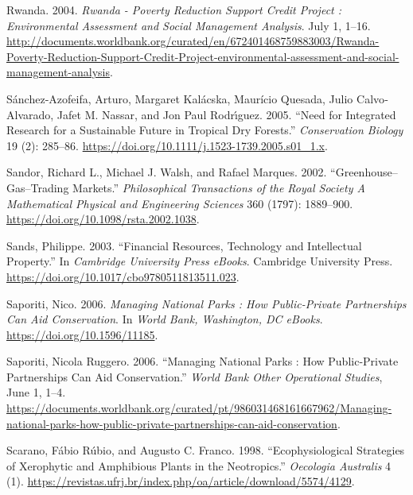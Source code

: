 \begin{CSLReferences}{1}{1}
Rwanda. 2004. \emph{Rwanda - Poverty Reduction Support Credit Project :
Environmental Assessment and Social Management Analysis}. July 1, 1--16.
\url{http://documents.worldbank.org/curated/en/672401468759883003/Rwanda-Poverty-Reduction-Support-Credit-Project-environmental-assessment-and-social-management-analysis}.

Sánchez‐Azofeifa, Arturo, Margaret Kalácska, Maurício Quesada, Julio
Calvo‐Alvarado, Jafet M. Nassar, and Jon Paul Rodrı́guez. 2005. {``Need
for Integrated Research for a Sustainable Future in Tropical Dry
Forests.''} \emph{Conservation Biology} 19 (2): 285--86.
\url{https://doi.org/10.1111/j.1523-1739.2005.s01_1.x}.

Sandor, Richard L., Michael J. Walsh, and Rafael Marques. 2002.
{``Greenhouse--Gas--Trading Markets.''} \emph{Philosophical Transactions
of the Royal Society A Mathematical Physical and Engineering Sciences}
360 (1797): 1889--900. \url{https://doi.org/10.1098/rsta.2002.1038}.

Sands, Philippe. 2003. {``Financial Resources, Technology and
Intellectual Property.''} In \emph{Cambridge University Press eBooks}.
Cambridge University Press.
\url{https://doi.org/10.1017/cbo9780511813511.023}.

Saporiti, Nico. 2006. \emph{Managing National Parks : How Public-Private
Partnerships Can Aid Conservation}. In \emph{World Bank, Washington, DC
eBooks}. \url{https://doi.org/10.1596/11185}.

Saporiti, Nicola Ruggero. 2006. {``Managing National Parks : How
Public-Private Partnerships Can Aid Conservation.''} \emph{World Bank
Other Operational Studies}, June 1, 1--4.
\url{https://documents.worldbank.org/curated/pt/986031468161667962/Managing-national-parks-how-public-private-partnerships-can-aid-conservation}.

Scarano, Fábio Rúbio, and Augusto C. Franco. 1998. {``Ecophysiological
Strategies of Xerophytic and Amphibious Plants in the Neotropics.''}
\emph{Oecologia Australis} 4 (1).
\url{https://revistas.ufrj.br/index.php/oa/article/download/5574/4129}.


\end{CSLReferences}
